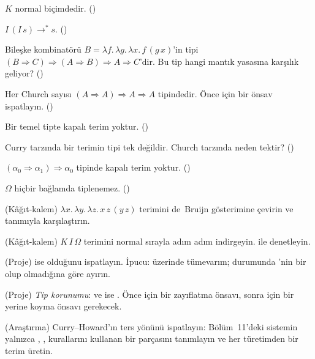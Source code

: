 \begin{alistirmalar}
 $K$ normal biçimdedir. ()

 $I\,(I\,s) \to^* s$. ()

 Bileşke kombinatörü $B = \lambda f.\,\lambda g.\,\lambda x.\,
f\,(g\,x)$'in tipi $(B \Rightarrow C) \Rightarrow (A \Rightarrow B)
\Rightarrow A \Rightarrow C$'dir. Bu tip hangi mantık yasasına karşılık
geliyor? ()

 Her Church sayısı $(A \Rightarrow A) \Rightarrow A \Rightarrow
A$ tipindedir. Önce  için bir önsav ispatlayın. ()

 Bir temel tipte kapalı terim yoktur. ()

 Curry tarzında bir terimin tipi tek değildir. Church tarzında
neden tektir? ()

 $(\alpha_0 \Rightarrow \alpha_1) \Rightarrow \alpha_0$
tipinde kapalı terim yoktur. ()

 $\Omega$ hiçbir bağlamda tiplenemez. ()

 (Kâğıt-kalem) $\lambda x.\,\lambda y.\,\lambda z.\, x\,z\,(y\,z)$
terimini de~Bruijn gösterimine çevirin ve  tanımıyla
karşılaştırın.

 (Kâğıt-kalem) $K\,I\,\Omega$ terimini normal sırayla adım
adım indirgeyin.  ile
denetleyin.

 (Proje)  ise  olduğunu
ispatlayın. İpucu:  üzerinde tümevarım;  durumunda
'nin bir  olup olmadığına göre ayırın.

 (Proje) \emph{Tip korunumu}:  ve
 ise . Önce  için bir
zayıflatma önsavı, sonra  için bir yerine koyma önsavı
gerekecek.

 (Araştırma) Curry--Howard'ın ters yönünü ispatlayın: Bölüm~11'deki
sistemin yalnızca , ,  kurallarını kullanan
bir  parçasını tanımlayın ve her türetimden bir terim
üretin.
\end{alistirmalar}
